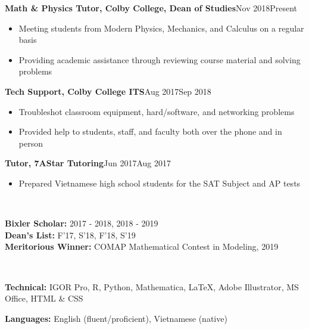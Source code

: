 \documentclass[letter, 9pt]{article}
\newcommand{\longunderline}[1]{\uline{#1\hfill\mbox{}}}
\begin{document}
	  \textbf{Math \& Physics Tutor, Colby College, Dean of Studies}\hfill Nov 2018\textemdash Present
	\begin{itemize}[noitemsep, nolistsep]
		\item Meeting students from Modern Physics, Mechanics, and Calculus on a regular basis
		\item Providing academic assistance through reviewing course material and solving problems
	\end{itemize}
	   \textbf{Tech Support, Colby College ITS}\hfill Aug 2017\textemdash Sep 2018
	\begin{itemize}[noitemsep, nolistsep]
		\item Troubleshot classroom equipment, hard/software, and networking problems
		\item Provided help to students, staff, and faculty both over the phone and in person
	\end{itemize}
	  \textbf{Tutor, 7AStar Tutoring}\hfill Jun 2017\textemdash Aug 2017
	\begin{itemize}[noitemsep, nolistsep]
		\item Prepared Vietnamese high school students for the SAT Subject and AP tests\\
	\end{itemize}

	\vspace{-7pt} \noindent \longunderline{\normalsize{{\color{colby}{\textbf{HONORS \& AWARDS}}}}}\\ \vspace{-7pt}
			
		\noindent \textbf{Bixler Scholar:} 2017 - 2018, 2018 - 2019\\
		\noindent \textbf{Dean's List:} F'17, S'18, F'18, S'19\\
		\noindent \textbf{Meritorious Winner:} {COMAP} Mathematical Contest in Modeling, 2019\\ \vspace{-7pt}
	
	
	\noindent \longunderline{\normalsize{{}}}
	\\ \vspace{-7pt}
	
	\noindent \textbf{Technical:} IGOR Pro, R, Python, Mathematica, \LaTeX{}, Adobe Illustrator, MS Office,  HTML \& CSS
	
	\noindent \textbf{Languages:} English (fluent/proficient), Vietnamese (native)\\
	\vspace{-7pt}
	
\end{document}
